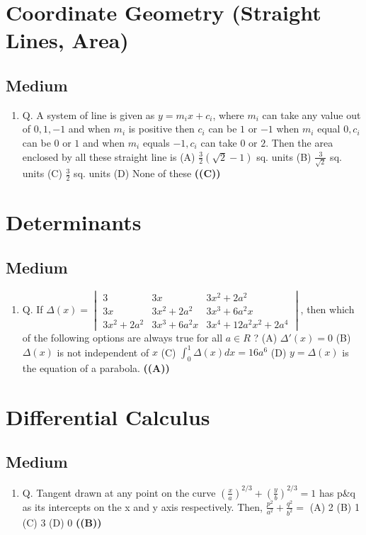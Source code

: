 \documentclass{article}
\begin{document}
\section{Coordinate Geometry (Straight Lines, Area)}
\subsection{Medium}
\begin{enumerate}
\item Q. A system of line is given as $y = m_i x + c_i$, where $m_i$ can take any value out of $0, 1, -1$ and when $m_i$ is positive then $c_i$ can be $1$ or $-1$ when $m_i$ equal $0, c_i$ can be $0$ or $1$ and when $m_i$ equals $-1, c_i$ can take $0$ or $2$. Then the area enclosed by all these straight line is
(A) $\frac{3}{2}(\sqrt{2}-1)$ sq. units
(B) $\frac{3}{\sqrt{2}}$ sq. units
(C) $\frac{3}{2}$ sq. units
(D) None of these \hfill \textbf{((C))}
\end{enumerate}
\section{Determinants}
\subsection{Medium}
\begin{enumerate}
\item Q. If $\Delta(x) = \begin{vmatrix} 3 & 3x & 3x^2 + 2a^2 \\ 3x & 3x^2 + 2a^2 & 3x^3 + 6a^2x \\ 3x^2 + 2a^2 & 3x^3 + 6a^2x & 3x^4 + 12a^2x^2 + 2a^4 \end{vmatrix}$, then which of the following
options are always true for all $a \in R$ ?
(A) $\Delta'(x) = 0$
(B) $\Delta(x)$ is not independent of $x$
(C) $\int_{0}^{1} \Delta(x)dx = 16a^6$
(D) $y=\Delta(x)$ is the equation of a parabola. \hfill \textbf{((A))}
\end{enumerate}
\section{Differential Calculus}
\subsection{Medium}
\begin{enumerate}
\item Q. Tangent drawn at any point on the curve $(\frac{x}{a})^{2/3}+(\frac{y}{b})^{2/3} = 1$ has p&q as its intercepts on the x and y axis respectively. Then, $\frac{p^2}{a^2}+\frac{q^2}{b^2} =$
(A) 2
(B) 1
(C) 3
(D) 0 \hfill \textbf{((B))}
\end{enumerate}
\end{document}
